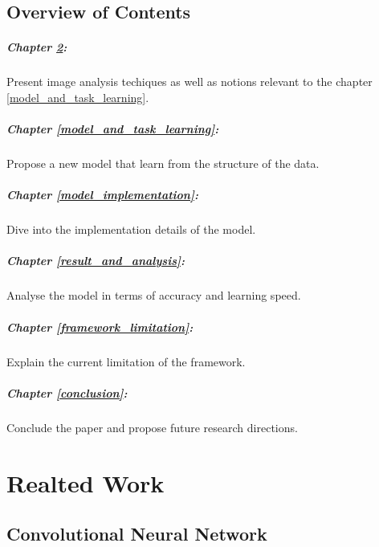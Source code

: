 \documentclass[11pt]{report}
\begin{document}
\section{Overview of Contents}

\paragraph{Chapter \ref{related_work}:} Present image analysis techiques as well as notions relevant to the chapter \ref{model_and_task_learning}.
\paragraph{Chapter \ref{model_and_task_learning}:} Propose a new model that learn from the structure of the data.
\paragraph{Chapter \ref{model_implementation}:} Dive into the implementation details of the model.
\paragraph{Chapter \ref{result_and_analysis}:} Analyse the model in terms of accuracy and learning speed.
\paragraph{Chapter \ref{framework_limitation}:} Explain the current limitation of the framework.
\paragraph{Chapter \ref{conclusion}:} Conclude the paper and propose future research directions.

\chapter{Realted Work} \label{related_work}

\section{Convolutional Neural Network}
\end{document}
